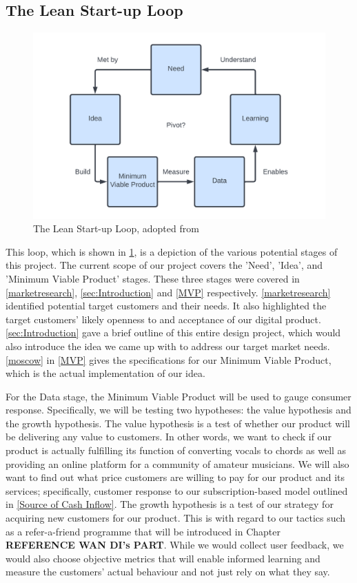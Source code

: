 \subsection{The Lean Start-up Loop}

\begin{figure}
    \centering
    \includegraphics[scale=0.4]{Figures/Lean Startup loop}
    \decoRule
    \caption{The Lean Start-up Loop, adopted from \protect\cite{leanstartuploop}}
    \label{fig:leanloop}
    \end{figure}
    

This loop, which is shown in \cref{fig:leanloop}, is a depiction of the various potential stages of this project. The current scope of our project covers the 'Need', 'Idea', and 'Minimum Viable Product' stages. These three stages were covered in \cref{marketresearch}, \cref{sec:Introduction} and \cref{MVP} respectively. \cref{marketresearch} identified potential target customers and their needs. It also highlighted the target customers' likely openness to and acceptance of our digital product.\cref{sec:Introduction} gave a brief outline of this entire design project, which would also introduce the idea we came up with to address our target market needs. \cref{moscow} in \cref{MVP} gives the specifications for our Minimum Viable Product, which is the actual implementation of our idea. 

For the Data stage, the Minimum Viable Product will be used to gauge consumer response. Specifically, we will be testing two hypotheses: the value hypothesis and the growth hypothesis. The value hypothesis is a test of whether our product will be delivering any value to customers. In other words, we want to check if our product is actually fulfilling its function of converting vocals to chords as well as providing an online platform for a community of amateur musicians. We will also want to find out what price customers are willing to pay for our product and its services; specifically, customer response to our subscription-based model outlined in \cref{Source of Cash Inflow}.  The growth hypothesis is a test of our strategy for acquiring new customers for our product. This is with regard to our tactics such as a refer-a-friend programme that will be introduced in Chapter \textbf{REFERENCE WAN DI's PART}. While we would collect user feedback, we would also choose objective metrics that will enable informed learning and measure the customers' actual behaviour and not just rely on what they say.

